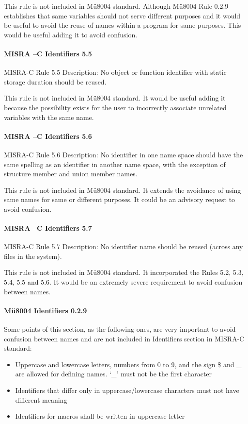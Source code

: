 This rule is not included in Mü8004 standard. Although Mü8004 Rule 0.2.9 establishes that same variables should not serve different purposes and it would be useful to avoid the reuse of names within a program for same purposes. This would be useful adding it to avoid confusion.


\paragraph{MISRA –C Identifiers 5.5}
MISRA-C Rule 5.5 Description: No object or function identifier with static storage duration should be reused.

This rule is not included in Mü8004 standard. It would be useful adding it because the possibility exists for the user to incorrectly associate unrelated variables with the same name.

\paragraph{MISRA –C Identifiers 5.6}
MISRA-C Rule 5.6 Description: No identifier in one name space should have the same spelling as an identifier in another name space, with the exception of structure member and union member names.

This rule is not included in Mü8004 standard. It extends the avoidance of using same names for same or different purposes. It could be an advisory request to avoid confusion.

\paragraph{MISRA –C Identifiers 5.7}
MISRA-C Rule 5.7 Description: No identifier name should be reused (across any files in the system).

This rule is not included in Mü8004 standard. It incorporated the Rules 5.2, 5.3, 5.4, 5.5 and 5.6. It would be an extremely severe requirement to avoid confusion between names.

\paragraph{Mü8004 Identifiers 0.2.9}
Some points of this section, as the following ones, are very important to avoid confusion between names and are not included in Identifiers section in MISRA-C standard:
\begin{itemize}
\item Uppercase and lowercase letters, numbers from 0 to 9, and the sign \$ and \_ are allowed for defining names. ‘\_’ must not be the first character
\item Identifiers that differ only in uppercase/lowercase characters must not have different meaning
\item Identifiers for macros shall be written in uppercase letter
\end{itemize}

